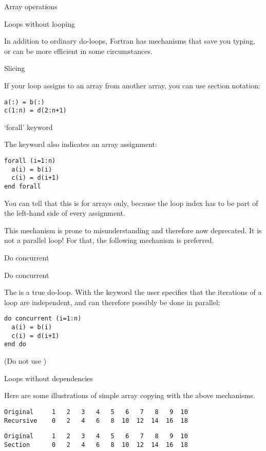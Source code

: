  {Array operations}

 {Loops without looping}

In addition to ordinary do-loops, Fortran has mechanisms that save you
typing, or can be more efficient in some circumstances.

 {Slicing}

If your loop assigns to an array from another array,
  you can use section notation:
\begin{verbatim}
a(:) = b(:)
c(1:n) = d(2:n+1)
\end{verbatim}

 {`forall' keyword}

The  keyword also indicates an array assignment:
\begin{verbatim}
forall (i=1:n)
  a(i) = b(i)
  c(i) = d(i+1)
end forall
\end{verbatim}
You can tell that this is for arrays only, because the loop index has
to be part of the left-hand side of every assignment.

This mechanism is prone to misunderstanding and therefore now
deprecated.
It is not a parallel loop! For that, the following mechanism is preferred.

 {Do concurrent}

\begin{block}{Do concurrent}
  \label{sl:farray-concurrent}

  The  is a true do-loop. With the
   keyword the user specifies that the
  iterations of a loop are independent, and can therefore possibly be
  done in parallel:
\begin{verbatim}
do concurrent (i=1:n)
  a(i) = b(i)
  c(i) = d(i+1)
end do
\end{verbatim}
(Do not use )
\end{block}

 {Loops without dependencies}

Here are some illustrations of simple array copying with the above
mechanisms.

\begin{verbatim}
Original     1   2   3   4   5   6   7   8   9  10
Recursive    0   2   4   6   8  10  12  14  16  18
\end{verbatim}

\begin{verbatim}
Original     1   2   3   4   5   6   7   8   9  10
Section      0   2   4   6   8  10  12  14  16  18
\end{verbatim}

